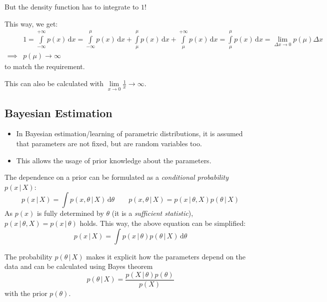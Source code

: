 \documentclass[a4paper, 11pt, accentcolor = tud3b]{tudreport}
\newcommand{\given}{\ensuremath{\,\vert\,}}
\newcommand{\dif}[1]{\ensuremath{\,\mathrm{d}#1}}
\begin{document}
					But the density function has to integrate to \(1\)!

					This way, we get:
					\begin{align}
						& 1 = \int\limits_{-\infty}^{+\infty} p(x) \dif{x} = \int\limits_{-\infty}^\mu p(x) \dif{x} + \int\limits_{\mu}^\mu p(x) \dif{x} + \int\limits_\mu^{+\infty} p(x) \dif{x} = \int\limits_{\mu}^\mu p(x) \dif{x} = \lim\limits_{\Delta x \to 0} p(\mu) \Delta x  \\
						\implies & p(\mu) \to \infty
					\end{align}
					to match the requirement.

					This can also be calculated with \( \lim\limits_{x \to 0} \frac{1}{x} \to \infty \).

			\subsection{Bayesian Estimation}
				\begin{itemize}
					\item In Bayesian estimation/learning of parametric distributions, it is assumed that parameters are not fixed, but are random variables too.
					\item This allows the usage of prior knowledge about the parameters.
				\end{itemize}

				The dependence on a prior can be formulated as a \emph{conditional probability} \( p(x \given X) \):
				\begin{equation}
					p(x \given X) = \int p(x, \theta \given X) \dif{\theta} \qquad p(x, \theta \given X) = p(x \given \theta, X) p(\theta \given X)
				\end{equation}
				As \( p(x) \) is fully determined by \(\theta\) (it is a \emph{sufficient statistic}), \( p(x \given \theta, X) = p(x \given \theta) \) holds. This way, the above equation can be simplified:
				\begin{equation}
					p(x \given X) = \int p(x \given \theta) p(\theta \given X) \dif{\theta}
				\end{equation}

				The probability \( p(\theta \given X) \) makes it explicit how the parameters depend on the data and can be calculated using Bayes theorem
				\begin{equation}
					p(\theta \given X) = \frac{p(X \given \theta) p(\theta)}{p(X)}
				\end{equation}
				with the prior \( p(\theta) \).
\end{document}
